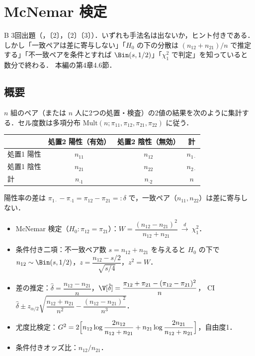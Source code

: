 \chapter{McNemar 検定}\label{ch:m06}

\begin{priobox}{B}
3回出題（，〔2〕，〔2〕〔3〕）．いずれも手法名は出ないか，ヒント付きである．
しかし「一致ペアは差に寄与しない」「$H_0$ の下の分散は $(n_{12}+n_{21})/n$ で推定する」「不一致ペアを条件とすれば $\Bin(s,1/2)$」「$\chi^2_1$ で判定」を知っていると数分で終わる．
本編の第4章4.6節．
\end{priobox}

\section{概要}\label{sec:m06-gaiyo}
$n$ 組のペア（または $n$ 人に2つの処置・検査）の2値の結果を次のように集計する．セル度数は多項分布 $\mathrm{Mult}(n;\pi_{11},\pi_{12},\pi_{21},\pi_{22})$ に従う．
\begin{center}\small
\begin{tabular}{@{}lccc@{}}
\toprule
 & 処置2 陽性（有効） & 処置2 陰性（無効） & 計\\
\midrule
処置1 陽性 & $n_{11}$ & $n_{12}$ & $n_{1\cdot}$\\
処置1 陰性 & $n_{21}$ & $n_{22}$ & $n_{2\cdot}$\\
\midrule
計 & $n_{\cdot1}$ & $n_{\cdot2}$ & $n$\\
\bottomrule
\end{tabular}
\end{center}
陽性率の差は $\pi_{1\cdot}-\pi_{\cdot1}=\pi_{12}-\pi_{21}=:\delta$ で，一致ペア（$n_{11},n_{22}$）は差に寄与しない．
\begin{pointbox}[覚える式]
\begin{itemize}
\item McNemar 検定（$H_0:\pi_{12}=\pi_{21}$）：$W=\dfrac{(n_{12}-n_{21})^2}{n_{12}+n_{21}}\ \xrightarrow{d}\ \chi^2_1$．
\item 条件付き二項：不一致ペア数 $s=n_{12}+n_{21}$ を与えると $H_0$ の下で $n_{12}\sim\Bin(s,1/2)$，$z=\dfrac{n_{12}-s/2}{\sqrt{s/4}}$，$z^2=W$．
\item 差の推定：$\hat\delta=\dfrac{n_{12}-n_{21}}{n}$，$\V[\hat\delta]=\dfrac{\pi_{12}+\pi_{21}-(\pi_{12}-\pi_{21})^2}{n}$，
      CI $\hat\delta\pm z_{\alpha/2}\sqrt{\dfrac{n_{12}+n_{21}}{n^2}-\dfrac{(n_{12}-n_{21})^2}{n^3}}$．
\item 尤度比検定：$G^2=2\Bigl[n_{12}\log\dfrac{2n_{12}}{n_{12}+n_{21}}+n_{21}\log\dfrac{2n_{21}}{n_{12}+n_{21}}\Bigr]$，自由度1．
\item 条件付きオッズ比：$n_{12}/n_{21}$．
\end{itemize}
\end{pointbox}

